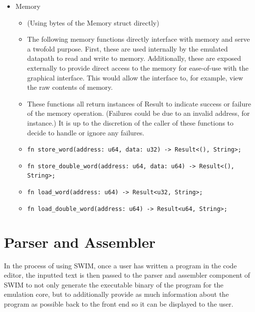 \documentclass[
    paper=letter,
    parskip=half,
    fontsize=12pt,
    titlepage=firstiscover,
    toc=bibliography,
    numbers=endperiod
]{scrartcl}
\providecommand{\tightlist}{%
  \setlength{\itemsep}{0pt}\setlength{\parskip}{0pt}}
\let\oldsection\section
\renewcommand{\section}{\newpage\oldsection}
\begin{document}
\begin{itemize}
    \item Memory
          \begin{itemize}
              \tightlist
              \item (Using bytes of the Memory struct directly)
              \item The following memory functions directly interface with memory and serve
                    a twofold purpose. First, these are used internally by the emulated
                    datapath to read and write to memory. Additionally, these are exposed
                    externally to provide direct access to the memory for ease-of-use with
                    the graphical interface. This would allow the interface to, for example,
                    view the raw contents of memory.
              \item These functions all return instances of Result to indicate success or
                    failure of the memory operation. (Failures could be due to an invalid
                    address, for instance.) It is up to the discretion of the caller of
                    these functions to decide to handle or ignore any failures.
              \item \texttt{fn store\_word(address: u64, data: u32) -\textgreater{} Result\textless(), String\textgreater;}
              \item \texttt{fn store\_double\_word(address: u64, data: u64) -\textgreater{} Result\textless(), String\textgreater;}
              \item \texttt{fn load\_word(address: u64) -\textgreater{} Result\textless u32, String\textgreater;}
              \item \texttt{fn load\_double\_word(address: u64) -\textgreater{} Result\textless u64, String\textgreater;}
          \end{itemize}
\end{itemize}

\section{Parser and Assembler}
\label{sec:parser}

In the process of using SWIM, once a user has written a program in the
code editor, the inputted text is then passed to the parser and
assembler component of SWIM to not only generate the executable binary
of the program for the emulation core, but to additionally provide as
much information about the program as possible back to the front end so
it can be displayed to the user.
\end{document}
